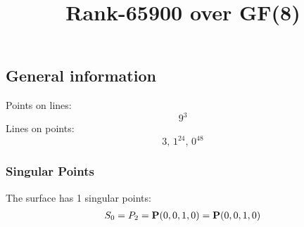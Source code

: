 \documentclass{article}
\newcommand\setTBstruts{\def\T{\rule{0pt}{2.6ex}}%
\def\B{\rule[-1.2ex]{0pt}{0pt}}}
\newcommand{\bP}{{\bf P}}
\begin{document}
 
\setTBstruts



{\allowdisplaybreaks%






\title{Rank-65900 over GF(8)}
\author{}%
\maketitle%
%
{}



\subsection*{General information}
Points on lines:
$$
9^3$$
Lines on points:
$$
3,\,1^{24},\,0^{48}$$
\subsubsection*{Singular Points}
The surface has 1 singular points:\\
\begin{align*}
S_{0} &= P_{2}=\bP(0, 0, 1, 0) = \bP(0, 0, 1, 0)\\
\end{align*}
}
\end{document}
